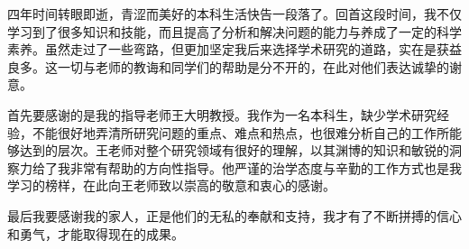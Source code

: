 
\begin{acknowledgements}

    四年时间转眼即逝，青涩而美好的本科生活快告一段落了。回首这段时间，我不仅学习到了很多知识和技能，而且提高了分析和解决问题的能力与养成了一定的科学素养。虽然走过了一些弯路，但更加坚定我后来选择学术研究的道路，实在是获益良多。这一切与老师的教诲和同学们的帮助是分不开的，在此对他们表达诚挚的谢意。

    首先要感谢的是我的指导老师王大明教授。我作为一名本科生，缺少学术研究经验，不能很好地弄清所研究问题的重点、难点和热点，也很难分析自己的工作所能够达到的层次。王老师对整个研究领域有很好的理解，以其渊博的知识和敏锐的洞察力给了我非常有帮助的方向性指导。他严谨的治学态度与辛勤的工作方式也是我学习的榜样，在此向王老师致以崇高的敬意和衷心的感谢。
    
    最后我要感谢我的家人，正是他们的无私的奉献和支持，我才有了不断拼搏的信心和勇气，才能取得现在的成果。

\end{acknowledgements}
